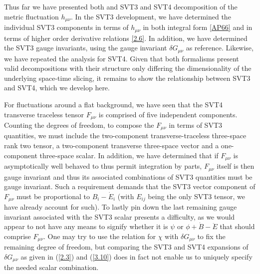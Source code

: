 Thus far we have presented both and SVT3 and SVT4 decomposition of the metric fluctuation $h_{\mu\nu}$. In the SVT3 development, we have determined the individual SVT3 components in terms of $h_{\mu\nu}$ in both integral form \eqref{AP66} and in terms of higher order derivative relations \eqref{2.6}. In addition, we have determined the SVT3 gauge invariants, using the gauge invariant $\delta G_{\mu\nu}$ as reference. Likewise, we have repeated the analysis for SVT4. Given that both formalisms present valid decompositions with their structure only differing the dimensionality of the underlying space-time slicing, it remains to show the relationship between SVT3 and SVT4, which we develop here.

For fluctuations around a flat background, we have seen that the SVT4 transverse traceless tensor $F_{\mu\nu}$ is comprised of five independent components. Counting the degrees of freedom, to compose the $F_{\mu\nu}$ in terms of SVT3 quantities, we must include the two-component transverse-traceless three-space rank two tensor, a two-component transverse three-space vector and a one-component three-space scalar. In addition, we have determined that if $F_{\mu\nu}$ is asymptotically well behaved to thus permit integration by parts, $F_{\mu\nu}$ itself is then gauge invariant and thus its associated combinations of SVT3 quantities must be gauge invariant. Such a requirement demands that the SVT3 vector component of $F_{\mu\nu}$ must be proportional to $B_i - \dot E_i$ (with $E_{ij}$ being the only SVT3 tensor, we have already account for such). To lastly pin down the last remaining gauge invariant associated with the SVT3 scalar presents a difficulty, as we would appear to not have any means to signify whether it is $\psi$ or $\phi+\dot B - \ddot E$ that should comprise $F_{\mu\nu}$. One may try to use the relation for $\chi$ with $\delta G_{\mu\nu}$ to fix the remaining degree of freedom, but comparing the SVT3 and SVT4 expansions of $\delta G_{\mu\nu}$ as given in (\ref{2.3}) and (\ref{3.10})  does in fact not enable us to uniquely specify the needed scalar combination. 

